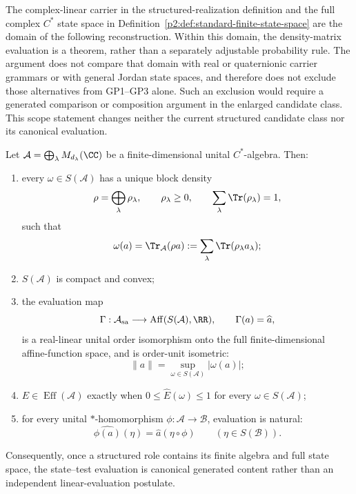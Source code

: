 \documentclass[12pt,a4paper]{article}
\begin{document}
\begin{remark}
\label{p2a:rem:complex-state-grammar-scope}
The complex-linear carrier in the structured-realization definition and the
full complex $C^*$ state space in
Definition~\ref{p2:def:standard-finite-state-space} are the domain of the
following reconstruction.  Within this domain, the density-matrix
evaluation is a theorem, rather than a separately adjustable probability
rule.  The argument does not compare that domain with real or quaternionic
carrier grammars or with general Jordan state spaces, and therefore does not
exclude those alternatives from GP1--GP3 alone.  Such an exclusion would
require a generated comparison or composition argument in the enlarged
candidate class.  This scope statement changes neither the current
structured candidate class nor its canonical evaluation.
\end{remark}

\begin{theorem}
\label{p2:thm:canonical-finite-state-test-evaluation}
Let \(\mathcal A=\bigoplus_\lambda M_{d_\lambda}(\CC)\) be a finite-dimensional
unital \(C^*\)-algebra.  Then:
\begin{enumerate}[label=(\roman*),leftmargin=2.2em]
\item every \(\omega\in S(\mathcal A)\) has a unique block density
\[
 \rho=\bigoplus_\lambda\rho_\lambda,
 \qquad \rho_\lambda\ge0,
 \qquad \sum_\lambda\Tr(\rho_\lambda)=1,
\]
such that
\[
 \omega(a)=\Tr_{\mathcal A}(\rho a)
 :=\sum_\lambda\Tr(\rho_\lambda a_\lambda);
\]
\item \(S(\mathcal A)\) is compact and convex;
\item the evaluation map
\[
 \Gamma:\mathcal A_{\rm sa}\longrightarrow
 \operatorname{Aff}(S(\mathcal A),\RR),
 \qquad \Gamma(a)=\widehat a,
\]
is a real-linear unital order isomorphism onto the full finite-dimensional
affine-function space, and is order-unit isometric:
\[
 \|a\|=\sup_{\omega\in S(\mathcal A)}|\omega(a)|;
\]
\item \(E\in\operatorname{Eff}(\mathcal A)\) exactly when
\(0\le\widehat E(\omega)\le1\) for every \(\omega\in S(\mathcal A)\);
\item for every unital \(*\)-homomorphism
\(\phi:\mathcal A\to\mathcal B\), evaluation is natural:
\[
 \widehat{\phi(a)}(\eta)=\widehat a(\eta\circ\phi)
 \qquad(\eta\in S(\mathcal B)).
\]
\end{enumerate}
Consequently, once a structured role contains its finite algebra and full
state space, the state--test evaluation is canonical generated content rather
than an independent linear-evaluation postulate.
\end{theorem}
\end{document}
